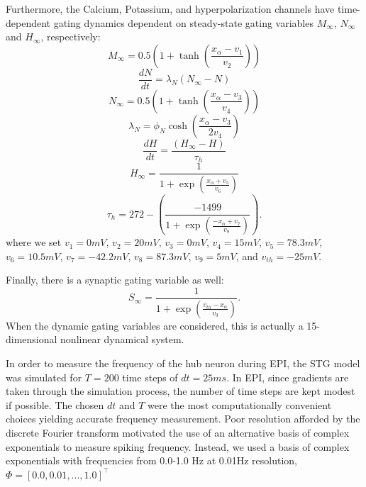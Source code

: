 \documentclass[11pt]{article}
\begin{document}
Furthermore, the Calcium, Potassium, and hyperpolarization channels have time-dependent gating dynamics dependent on steady-state gating variables $M_\infty$, $N_\infty$ and $H_\infty$, respectively:
\begin{equation}  M_{\infty} = 0.5 \left( 1 + \tanh \left( \frac{x_\alpha - v_1}{v_2} \right) \right) \end{equation}
\begin{equation}  \frac{dN}{dt} = \lambda_N (N_\infty - N)  \end{equation}
\begin{equation}  N_\infty = 0.5 \left( 1 + \tanh \left( \frac{x_\alpha - v_3}{v_4} \right) \right) \end{equation}
\begin{equation}  \lambda_N = \phi_N \cosh \left( \frac{x_\alpha - v_3}{2 v_4} \right) \end{equation}
\begin{equation}  \frac{dH}{dt} = \frac{\left( H_\infty - H \right)}{\tau_h} \end{equation}
\begin{equation}  H_\infty = \frac{1}{1 + \exp \left( \frac{x_\alpha + v_5}{v_6} \right)} \end{equation}
\begin{equation}  \tau_h = 272 - \left( \frac{-1499}{1 + \exp \left( \frac{-x_\alpha + v_7}{v_8} \right)} \right).
 \end{equation}
where we set $v_1 = 0mV$, $v_2  = 20mV$, $v_3 = 0mV$, $v_4 = 15mV$, $v_5 = 78.3mV$,
$v_6 = 10.5mV$, $v_7 = -42.2mV$, $v_8 = 87.3mV$, $v_9 = 5mV$, and $v_{th} = -25mV$.  

Finally, there is a synaptic gating variable as well:
\begin{equation} S_\infty = \frac{1}{1 + \exp \left( \frac{v_{th} - x_\alpha}{v_9} \right)} .
\end{equation}
When the dynamic gating variables are considered, this is actually a 15-dimensional nonlinear dynamical system.

In order to measure the frequency of the hub neuron during EPI, the STG model was simulated for $T = 200$ time steps of $dt = 25ms$.  In EPI, since gradients are taken through the simulation process, the number of time steps are kept modest if possible. The chosen $dt$ and $T$ were the most computationally convenient choices yielding accurate frequency measurement.  Poor resolution afforded by the discrete Fourier transform motivated the use of an alternative basis of complex exponentials to measure spiking frequency.  Instead, we used a basis of complex exponentials with frequencies from 0.0-1.0 Hz at 0.01Hz resolution, $\Phi = \left[ 0.0, 0.01, ..., 1.0 \right]^\top$
\end{document}
